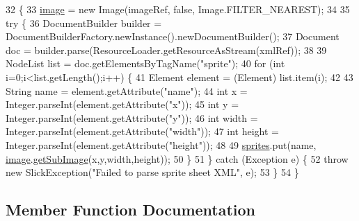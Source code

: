 \begin{DoxyCode}
32     \{
33         \mbox{\hyperlink{classorg_1_1newdawn_1_1slick_1_1_x_m_l_packed_sheet_a8f418205fde15e4b3e64b363b74a7fae}{image}} = \textcolor{keyword}{new} Image(imageRef, \textcolor{keyword}{false}, Image.FILTER\_NEAREST);
34     
35         \textcolor{keywordflow}{try} \{
36             DocumentBuilder builder = DocumentBuilderFactory.newInstance().newDocumentBuilder();
37             Document doc = builder.parse(ResourceLoader.getResourceAsStream(xmlRef));
38             
39             NodeList list = doc.getElementsByTagName(\textcolor{stringliteral}{"sprite"});
40             \textcolor{keywordflow}{for} (\textcolor{keywordtype}{int} i=0;i<list.getLength();i++) \{
41                 Element element = (Element) list.item(i);
42                 
43                 String name = element.getAttribute(\textcolor{stringliteral}{"name"});
44                 \textcolor{keywordtype}{int} x = Integer.parseInt(element.getAttribute(\textcolor{stringliteral}{"x"}));
45                 \textcolor{keywordtype}{int} y = Integer.parseInt(element.getAttribute(\textcolor{stringliteral}{"y"}));
46                 \textcolor{keywordtype}{int} width = Integer.parseInt(element.getAttribute(\textcolor{stringliteral}{"width"}));
47                 \textcolor{keywordtype}{int} height = Integer.parseInt(element.getAttribute(\textcolor{stringliteral}{"height"}));
48                 
49                 \mbox{\hyperlink{classorg_1_1newdawn_1_1slick_1_1_x_m_l_packed_sheet_a4afb6e9a66274013a24e53f4f01864bb}{sprites}}.put(name, \mbox{\hyperlink{classorg_1_1newdawn_1_1slick_1_1_x_m_l_packed_sheet_a8f418205fde15e4b3e64b363b74a7fae}{image}}.\mbox{\hyperlink{classorg_1_1newdawn_1_1slick_1_1_image_a2ccb3bbdda674f9efdec614a54e31e32}{getSubImage}}(x,y,width,height));
50             \}
51         \} \textcolor{keywordflow}{catch} (Exception e) \{
52             \textcolor{keywordflow}{throw} \textcolor{keyword}{new} SlickException(\textcolor{stringliteral}{"Failed to parse sprite sheet XML"}, e);
53         \}
54     \}
\end{DoxyCode}


\subsection{Member Function Documentation}
\mbox{\label{classorg_1_1newdawn_1_1slick_1_1_x_m_l_packed_sheet_a4d32457f7a969d9e97965017e878858b}} 
